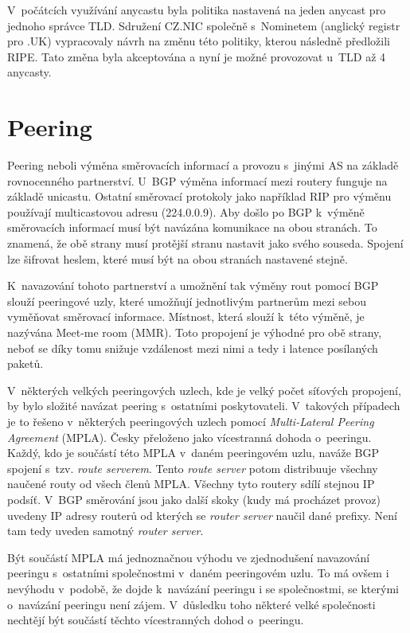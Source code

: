 \documentclass[thesis=M,czech]{src/FITthesis}[2019/12/23]
\begin{document}
V~počátcích využívání anycastu byla politika nastavená na jeden anycast pro jednoho správce TLD. Sdružení CZ.NIC společně s~Nominetem (anglický registr pro .UK) vypracovaly návrh na změnu této politiky, kterou následně předložili RIPE. Tato změna byla akceptována a nyní je možné provozovat u~TLD až 4 anycasty. \cite{cznic-anycast}

\section{Peering}
Peering neboli výměna směrovacích informací a provozu s~jinými AS na základě rovnocenného partnerství. U~BGP výměna informací mezi routery funguje na základě unicastu. Ostatní směrovací protokoly jako například RIP pro výměnu používají multicastovou adresu (224.0.0.9). Aby došlo po BGP k~výměně směrovacích informací musí být navázána komunikace na obou stranách. To znamená, že obě strany musí protější stranu nastavit jako svého souseda. Spojení lze šifrovat heslem, které musí být na obou stranách nastavené stejně. 

K~navazování tohoto partnerství a umožnění tak výměny rout pomocí BGP slouží peeringové uzly, které umožňují jednotlivým partnerům mezi sebou vyměňovat směrovací informace. Místnost, která slouží k~této výměně, je nazývána Meet-me room (MMR). Toto propojení je výhodné pro obě strany, neboť se díky tomu snižuje vzdálenost mezi nimi a tedy i latence posílaných paketů. 

V~některých velkých peeringových uzlech, kde je velký počet síťových propojení, by bylo složité navázat peering s~ostatními poskytovateli. V~takových případech je to řešeno v~některých peeringových uzlech pomocí \textit{Multi-Lateral Peering Agreement} (MPLA). Česky přeloženo jako vícestranná dohoda o~peeringu. Každý, kdo je součástí této MPLA v~daném peeringovém uzlu, naváže BGP spojení s~tzv. \textit{route serverem}. Tento \textit{route server} potom distribuuje všechny naučené routy od všech členů MPLA. Všechny tyto routery sdílí stejnou IP podsíť. V~BGP směrování jsou jako další skoky (kudy má procházet provoz) uvedeny IP adresy routerů od kterých se \textit{router server} naučil dané prefixy. Není tam tedy uveden samotný \textit{router server}. 

Být součástí MPLA má jednoznačnou výhodu ve zjednodušení navazování peeringu s~ostatními společnostmi v~daném peeringovém uzlu. To má ovšem i nevýhodu v~podobě, že dojde k~navázání peeringu i se společnostmi, se kterými o~navázání peeringu není zájem. V~důsledku toho některé velké společnosti nechtějí být součástí těchto vícestranných dohod o~peeringu. \cite{oreilly-bgp, bgp-mmr}
\end{document}
